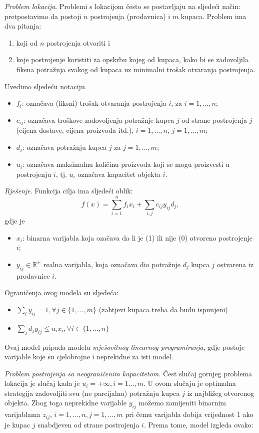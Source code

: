 \documentclass[a4paper, utf8, 11pt, colorlinks]{book}
\begin{document}
\emph{Problem lokacija}. Problemi s lokacijom često se postavljaju na sljedeći način: pretpostavimo da postoji $n$ postrojenja (prodavnica)  i  $m$ kupaca. Problem ima dva pitanja:
\begin{enumerate}
    \item koji od $n$ postrojenja otvoriti i
     \item koje  postrojenje koristiti za opskrbu kojeg od kupaca, kako bi se zadovoljila fiksna potražnja svakog od kupaca   uz minimalni trošak otvaranja postrojenja.
\end{enumerate}
Uvedimo sljedeću notaciju.
\begin{itemize}
    \item  $f_{i}$: označava (fiksni) trošak otvaranja postrojenja $i$, za  $ i = 1,  \ldots, n$;
    \item $c_{ij}$: označava troškove zadovoljenja potražnje  kupca $j$ od strane postrojenja $j$ (cijena dostave, cijena proizvoda itd.), $i = 1, \ldots, n$, $j = 1,  \ldots, m$;
    \item $d_{j}$: označava potražnju kupca $j$ za $j = 1, \ldots, m$;
    \item $u_{i}$: označava maksimalnu količinu proizvoda koji se mogu proizvesti u postrojenju $i$, tj. $u_{i}$ označava kapacitet objekta $i$.
\end{itemize}

\emph{Rješenje}. Funkcija cilja ima sljedeći oblik:
$$ f(x) = \sum_{i=1}^n f_i x_i  + \sum_{i,j} c_{ij} y_{ij} d_j,$$
gdje je
\begin{itemize}
    \item $x_i$: binarna varijabla koja ozačava da li je (1) ili nije (0) otvoreno postrojenje $i$;
    \item $y_{ij} \in \mathbb{R}^+$ realna varijabla, koja označava dio potražnje $d_j$ kupca $j$ ostvarena iz prodavnice $i$.
\end{itemize}
Ograničenja ovog modela su sljedeća:
\begin{itemize}
    \item $\sum_{i} y_{ij} = 1, \forall j\in\{1,\ldots,m\}$ (zahtjevi kupaca treba da budu ispunjeni)
    \item $\sum_{j} d_j y_{ij} \leq u_i x_i, \forall i \in \{1,\ldots,n\}$
\end{itemize}
Ovaj model pripada modelu \emph{mješovitnog linearnog programiranja}, gdje postoje varijable koje su cjelobrojne i neprekidne za isti model.

\emph{Problem postrojenja sa neograničenim kapacitetom.}
Čest slučaj gornjeg problema lokacija je slučaj kada je  $ u_{i} = + \infty,i=1\ldots,m$. U ovom slučaju je   optimalna strategija zadovoljiti svu (ne parcijalnu) potražnju kupca $j$ iz najbližeg otvorenog objekta. Zbog toga neprekidne varijable  $y_{ij}$ možemo zamijeniti binarnim varijablama $z_{ij}$, $i=1,\ldots,n, j=1,\ldots,m$ pri čemu varijabla dobija vrijednost 1 ako je kupac $j$ snabdjeven od strane postrojenja $i$. Prema tome, model izgleda ovako:
\end{document}
